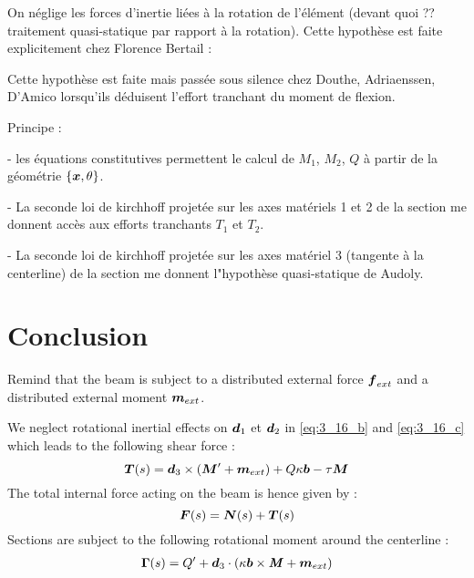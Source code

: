 On néglige les forces d'inertie liées à la rotation de l'élément  (devant quoi ?? traitement quasi-statique par rapport à la rotation). Cette hypothèse est faite explicitement chez Florence Bertail :

\cite{Casati2013}

Cette hypothèse est faite mais passée sous silence chez Douthe, Adriaenssen, D'Amico lorsqu'ils déduisent l'effort tranchant du moment de flexion.

Principe :

- les équations constitutives permettent le calcul de $M_1$, $M_2$, $Q$ à partir de la géométrie $\{\boldsymbol{x},\theta\}$.

- La seconde loi de kirchhoff projetée sur les axes matériels 1 et 2 de la section me donnent accès aux efforts tranchants $T_1$ et $T_2$.

- La seconde loi de kirchhoff projetée sur les axes matériel 3 (tangente à la centerline) de la section me donnent l"hypothèse quasi-statique de Audoly.

\section{Conclusion}
Remind that the beam is subject to a distributed external force $\boldsymbol{f}_{ext}$ and a distributed external moment $\boldsymbol{m}_{ext}$.

We neglect rotational inertial effects on $\boldsymbol{d}_1$ et $\boldsymbol{d}_2$ in \eqref{eq:3_16_b} and \eqref{eq:3_16_c} which leads to the following shear force :
\begin{equation}
	\boldsymbol{T}(s) = \boldsymbol{d}_3 \times (\boldsymbol{M}' + \boldsymbol{m}_{ext})
		+ Q \kappa\boldsymbol{b} - \tau \boldsymbol{M}
\end{equation}
 The total internal force acting on the beam is hence given by :
\begin{equation}
	\boldsymbol{F}(s) = \boldsymbol{N}(s) + \boldsymbol{T}(s)
\end{equation}
Sections are subject to the following rotational moment around the centerline :
\begin{equation}
	\begin{aligned}
	\boldsymbol{\Gamma}(s) = Q' + \boldsymbol{d}_3 \cdot ( \kappa\boldsymbol{b} \times \boldsymbol{\mathit{M}} + \boldsymbol{m}_{ext})
	\end{aligned}
\end{equation}




